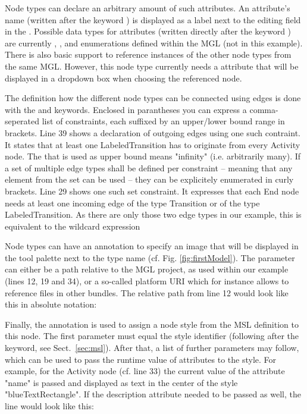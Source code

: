 \documentclass[a4paper,american,12pt]{scrreprt}
\begin{document}
Node types can declare an arbitrary amount of such attributes. An attribute's
name (written after the keyword ) is displayed as a label next to the
editing field in the . Possible data types for attributes
(written directly after the keyword ) are currently ,
,  and enumerations defined within the MGL (not in this
example). There is also basic support to reference instances of the other node
types from the same MGL. However, this node type currently needs a  attribute
that will be displayed in a dropdown box when choosing the referenced node.

The definition how the different node types can be connected using edges is
done with the  and  keywords\footnotemark{}.
%
%
Enclosed in parantheses you can express a comma-seperated list of constraints,
each suffixed by an upper/lower bound range in brackets. Line 39 shows a 
declaration of outgoing edges using one such contraint. It states that at least
one LabeledTransition has to originate from every Activity node. The \code{*}
that is used as upper bound means "infinity" (i.e. arbitrarily many). If a set
of multiple edge types shall be defined per constraint -- meaning that any
element from the set can be used -- they can be explicitely enumerated
in curly brackets. Line 29 shows one such set constraint. It expresses that each
End node needs at least one incoming edge of the type Transition or of the type
LabeledTransition. As there are only those two edge types in our example, this
is equivalent to the wildcard expression \code{(*[1 ,*])}

Node types can have an  annotation to specify an image that will be
displayed in the tool palette next to the type name (cf. Fig.
\ref{fig:firstModel}). The parameter can either be a path relative to the MGL
project, as used within our example (lines 12, 19 and 34), or a so-called
platform URI which for instance allows to reference files in other bundles. The
relative path from line 12 would look like this in absolute notation:


\FloatBarrier

Finally, the  annotation is used to assign a node style from the
MSL definition to this node. The first parameter must equal the style identifier
(following after the  keyword, see Sect.~\ref{sec:msl}). After
that, a list of further parameters may follow, which can be used to pass the
runtime value of attributes to the style. For example, for the Activity node
(cf. line 33) the current value of the attribute "name" is passed and displayed
as text in the center of the style "blueTextRectangle". If the description
attribute needed to be passed as well, the line would look like this:
\end{document}
